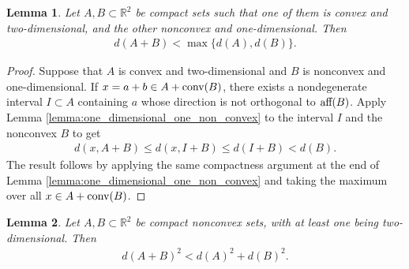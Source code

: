 \documentclass[11pt]{article}
\newtheorem{lemma}{Lemma}[section]
\begin{document}
\begin{lemma}\label{lemma:convex_nonconvex_two_one}
    Let $A,B\subset\mathbb{R}^2$ be compact sets such that one of them is convex and two-dimensional, and the other nonconvex and one-dimensional. Then
    \begin{align*}
        d(A+B)<\max\{d(A),d(B)\}.
    \end{align*}
\end{lemma}

\begin{proof}
    Suppose that $A$ is convex and two-dimensional and $B$ is nonconvex and one-dimensional. If $x=a+b\in A+\textup{conv}(B)$, there exists a nondegenerate interval $I\subset A$ containing $a$ whose direction is not orthogonal to $\textup{aff}(B)$. Apply Lemma \ref{lemma:one_dimensional_one_non_convex} to the interval $I$ and the nonconvex $B$ to get
    \begin{align*}
        d(x,A+B)\leq d(x,I+B)\leq d(I+B)<d(B).
    \end{align*}
    The result follows by applying the same compactness argument at the end of Lemma \ref{lemma:one_dimensional_one_non_convex} and taking the maximum over all $x\in A+\textup{conv}(B)$.
\end{proof}

\begin{lemma}\label{lemma:both_nonconvex_oneset_two_dimensional}
    Let $A,B\subset\mathbb{R}^2$ be compact nonconvex sets, with at least one being two-dimensional. Then
    \begin{align*}
        d(A+B)^2<d(A)^2+d(B)^2.
    \end{align*}
\end{lemma}
\end{document}
